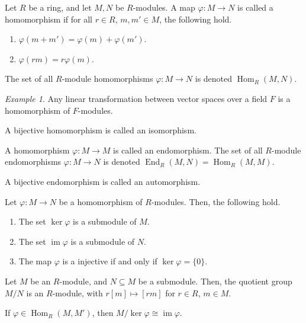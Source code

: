 \documentclass[11pt]{article}
\DeclareMathOperator{\im}{im}
\DeclareMathOperator{\Hom}{Hom}
\DeclareMathOperator{\End}{End}
\theoremstyle{definition}
\theoremstyle{remark}
\newtheorem*{example}{Example}
\numberwithin{equation}{section}
\begin{document}
    \begin{definition}
        Let $R$ be a ring, and let $M, N$ be $R$-modules. A map $\varphi\colon M \to
        N$ is called a homomorphism if for all $r \in R$, $m, m' \in M$, the
        following hold. \begin{enumerate}
            \itemsep0em
            \item $\varphi(m + m') = \varphi(m) + \varphi(m')$.
            \item $\varphi(rm) = r\varphi(m)$.
        \end{enumerate}
        The set of all $R$-module homomorphisms $\varphi\colon M \to N$ is denoted
        $\Hom_R(M, N)$.
    \end{definition}
    \begin{example}
        Any linear transformation between vector spaces over a field $F$ is a
        homomorphism of $F$-modules.
    \end{example}
    \begin{definition}
        A bijective homomorphism is called an isomorphism.
    \end{definition}
    \begin{definition}
        A homomorphism $\varphi\colon M \to M$ is called an endomorphism.
        The set of all $R$-module endomorphisms $\varphi\colon M \to N$ is denoted
        $\End_R(M, N) = \Hom_R(M, M)$.
    \end{definition}
    \begin{definition}
        A bijective endomorphism is called an automorphism.
    \end{definition}

    \begin{lemma}
        Let $\varphi\colon M \to N$ be a homomorphism of $R$-modules. Then, the
        following hold. \begin{enumerate}
            \itemsep0em
            \item The set $\ker\varphi$ is a submodule of $M$.
            \item The set $\im\varphi$ is a submodule of $N$.
            \item The map $\varphi$ is a injective if and only if $\ker\varphi =
            \{0\}$.
        \end{enumerate}
    \end{lemma}

    \begin{theorem}
        Let $M$ be an $R$-module, and $N\subseteq M$ be a submodule. Then, the
        quotient group $M/N$ is an $R$-module, with $r[m] \mapsto [rm]$ for $r \in
        R$, $m \in M$.
    \end{theorem}

    \begin{theorem}
        If $\varphi \in \Hom_R(M, M')$, then $M/\ker\varphi \cong \im\varphi$.
    \end{theorem}
\end{document}
